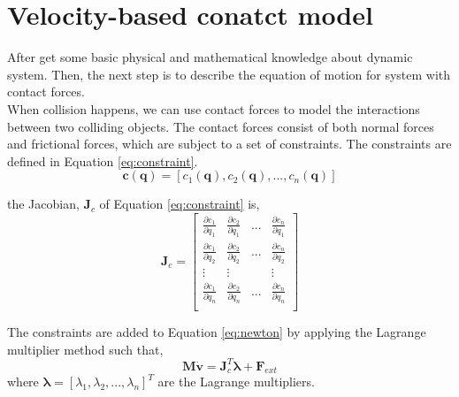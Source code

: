 \section{Velocity-based conatct model}
    After get some basic physical and mathematical knowledge about dynamic system. Then,  the next step is to describe the equation of motion for system with contact forces.  \\

    When collision happens, we can use contact forces to model the interactions between two colliding objects. The contact forces consist of both normal forces and frictional forces, which are subject to a set of constraints. The constraints are defined in Equation \ref{eq:constraint}.
    \begin{equation}
        \pmb{c}(\pmb{q}) = [c_1(\pmb{q}),c_2(\pmb{q}),...,c_n(\pmb{q})]
        \label{eq:constraint}
    \end{equation}

    the Jacobian, $\pmb{J}_{c}$ of Equation \ref{eq:constraint} is,
    \begin{equation}
        \pmb{J}_{c} = 
        \begin{bmatrix}
            \frac{\partial{c_1}}{\partial{q_1}} & \frac{\partial{c_2}}{\partial{q_1}} & ... & \frac{\partial{c_n}}{\partial{q_1}} \\
            \frac{\partial{c_1}}{\partial{q_2}} & \frac{\partial{c_2}}{\partial{q_2}} & ... & \frac{\partial{c_n}}{\partial{q_2}} \\
            \vdots & \vdots & & \vdots\\
            \frac{\partial{c_1}}{\partial{q_n}} & \frac{\partial{c_2}}{\partial{q_n}} & ... & \frac{\partial{c_n}}{\partial{q_n}} \\
        \end{bmatrix}
        \label{Jacobianb}
    \end{equation}

    The constraints are added to Equation \ref{eq:newton} by applying the Lagrange multiplier method such that,
    \begin{equation}
        \pmb{M}\dot{\mathbf{v}} = \pmb{J}_{c}^{T}\pmb{\lambda} + \mathbf{F}_{ext}
        \label{eq:cone}
    \end{equation}
    where $\pmb{\lambda} = [\lambda_1, \lambda_2, ... , \lambda_n]^T$ are the Lagrange multipliers.

